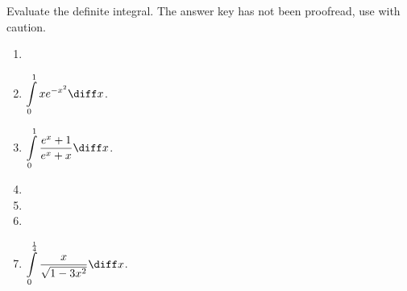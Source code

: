 Evaluate the definite integral. The answer key has not been proofread, use with caution.
\begin{enumerate}[ref={\fcProblemRef}]
\item 
\item $\displaystyle\int\limits_{0}^{1}xe^{-x^2} \diff x$.

\item $\displaystyle\int\limits_{0}^{1}\frac{e^x+1}{e^x+x} \diff x$.

\item 
\item 
\item 

\item $\displaystyle\int\limits_{0}^{\frac{1}4}\frac{x }{\sqrt{1-3x^2}}\diff x$.


\end{enumerate}
